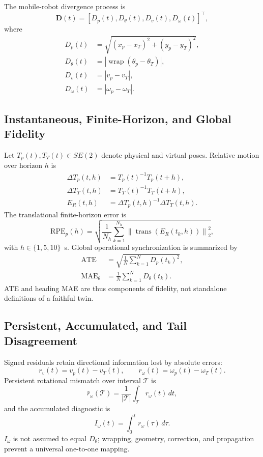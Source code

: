 \documentclass[journal]{IEEEtran}
\begin{document}
The mobile-robot divergence process is
\begin{equation}
\mathbf{D}(t)=[D_p(t),D_\theta(t),D_v(t),D_\omega(t)]^{\top},
\end{equation}
where
\begin{align}
D_p(t)&=\sqrt{(x_p-x_T)^2+(y_p-y_T)^2},\\
D_\theta(t)&=\left|\operatorname{wrap}(\theta_p-\theta_T)\right|,\\
D_v(t)&=|v_p-v_T|,\\
D_\omega(t)&=|\omega_p-\omega_T|.
\end{align}

\subsection{Instantaneous, Finite-Horizon, and Global Fidelity}
Let $T_p(t),T_T(t)\in SE(2)$ denote physical and virtual poses. Relative motion over horizon $h$ is
\begin{align}
\Delta T_p(t,h)&=T_p(t)^{-1}T_p(t+h),\\
\Delta T_T(t,h)&=T_T(t)^{-1}T_T(t+h),\\
E_R(t,h)&=\Delta T_p(t,h)^{-1}\Delta T_T(t,h).
\end{align}
The translational finite-horizon error is
\begin{equation}
\mathrm{RPE}_p(h)=\sqrt{\frac{1}{N_h}\sum_{k=1}^{N_h}\left\|\operatorname{trans}(E_R(t_k,h))\right\|_2^2},
\end{equation}
with $h\in\{1,5,10\}$~s. Global operational synchronization is summarized by
\begin{align}
\mathrm{ATE}&=\sqrt{\frac{1}{N}\sum_{k=1}^{N}D_p(t_k)^2},\\
\mathrm{MAE}_\theta&=\frac{1}{N}\sum_{k=1}^{N}D_\theta(t_k).
\end{align}
ATE and heading MAE are thus components of fidelity, not standalone definitions of a faithful twin.

\subsection{Persistent, Accumulated, and Tail Disagreement}
Signed residuals retain directional information lost by absolute errors:
\begin{equation}
r_v(t)=v_p(t)-v_T(t),\qquad r_\omega(t)=\omega_p(t)-\omega_T(t).
\end{equation}
Persistent rotational mismatch over interval $\mathcal{T}$ is
\begin{equation}
\bar r_\omega(\mathcal{T})=\frac{1}{|\mathcal{T}|}\int_{\mathcal{T}}r_\omega(t)\,dt,
\end{equation}
and the accumulated diagnostic is
\begin{equation}
I_\omega(t)=\int_0^t r_\omega(\tau)\,d\tau.
\end{equation}
$I_\omega$ is not assumed to equal $D_\theta$; wrapping, geometry, correction, and propagation prevent a universal one-to-one mapping.
\end{document}
